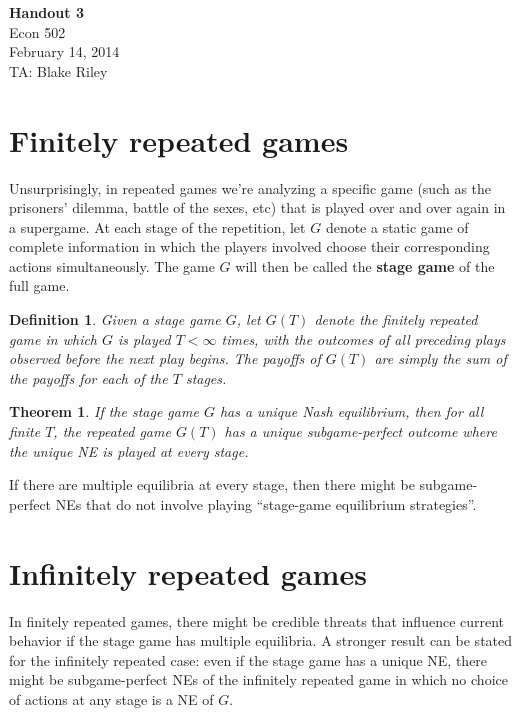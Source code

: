 \documentclass[letter, 10pt]{article}
\theoremstyle{basic}
\newtheorem{definition}{Definition}[section]
\newtheorem{theorem}{Theorem}[section]
\begin{document}
\begin{spacing}{1.0}

\noindent
\textbf{Handout 3} \\
Econ 502 \\
February 14, 2014 \\
TA: Blake Riley \\

\section{Finitely repeated games}

Unsurprisingly, in repeated games we're analyzing a
specific game (such as the prisoners' dilemma, battle of
the sexes, etc) that is played over and over again in a
supergame. At each stage of the repetition, let $G$
denote a static game of complete information in which the
players involved choose their corresponding actions
simultaneously. The game $G$ will then be called the
\textbf{stage game} of the full game.

\begin{definition}
  Given a stage game $G$, let $G(T)$ denote the finitely
  repeated game in which $G$ is played $T<\infty$ times,
  with the outcomes of all preceding plays observed
  before the next play begins. The payoffs of $G(T)$ are
  simply the sum of the payoffs for each of the $T$ stages.
\end{definition}

\begin{theorem}
  If the stage game $G$ has a unique Nash equilibrium,
  then for all finite $T$, the repeated game $G(T)$ has a
  unique subgame-perfect outcome where the unique NE is
  played at every stage.
\end{theorem}

If there are multiple equilibria at every
stage, then there might be subgame-perfect NEs that do
not involve playing ``stage-game equilibrium
strategies''.

\section{Infinitely repeated games}

In finitely repeated games, there might be credible threats that influence
current behavior if the stage game has multiple equilibria. A stronger
result can be stated for the infinitely repeated case: even if the stage
game has a unique NE, there might be subgame-perfect NEs of the infinitely
repeated game in which no choice of actions at any stage is a NE of $G$.


\end{spacing}
\end{document}
